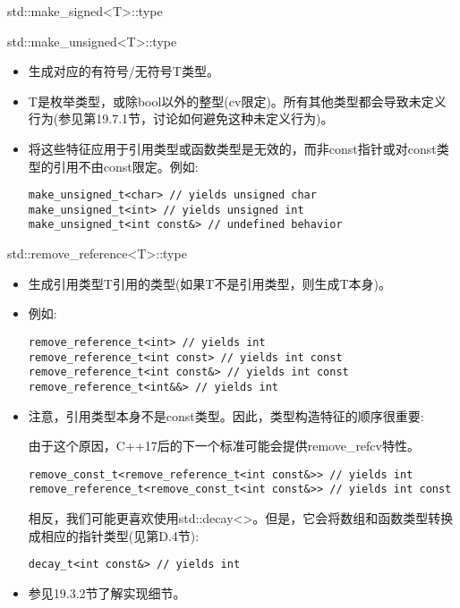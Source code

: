 std::make\_signed<T>::type

std::make\_unsigned<T>::type

\begin{itemize}
\item
生成对应的有符号/无符号T类型。

\item
T是枚举类型，或除bool以外的整型(cv限定)。所有其他类型都会导致未定义行为(参见第19.7.1节，讨论如何避免这种未定义行为)。

\item
将这些特征应用于引用类型或函数类型是无效的，而非const指针或对const类型的引用不由const限定。例如:
\begin{lstlisting}[style=styleCXX]
make_unsigned_t<char> // yields unsigned char
make_unsigned_t<int> // yields unsigned int
make_unsigned_t<int const&> // undefined behavior
\end{lstlisting}
\end{itemize}

std::remove\_reference<T>::type

\begin{itemize}
\item
生成引用类型T引用的类型(如果T不是引用类型，则生成T本身)。

\item
例如:
\begin{lstlisting}[style=styleCXX]
remove_reference_t<int> // yields int
remove_reference_t<int const> // yields int const
remove_reference_t<int const&> // yields int const
remove_reference_t<int&&> // yields int
\end{lstlisting}

\item
注意，引用类型本身不是const类型。因此，类型构造特征的顺序很重要:

\begin{tcolorbox}[colback=webgreen!5!white,colframe=webgreen!75!black]
\hspace*{0.75cm}由于这个原因，C++17后的下一个标准可能会提供remove\_refcv特性。
\end{tcolorbox}

\begin{lstlisting}[style=styleCXX]
remove_const_t<remove_reference_t<int const&>> // yields int
remove_reference_t<remove_const_t<int const&>> // yields int const
\end{lstlisting}

相反，我们可能更喜欢使用std::decay<>。但是，它会将数组和函数类型转换成相应的指针类型(见第D.4节):

\begin{lstlisting}[style=styleCXX]
decay_t<int const&> // yields int
\end{lstlisting}

\item
参见19.3.2节了解实现细节。
\end{itemize}

